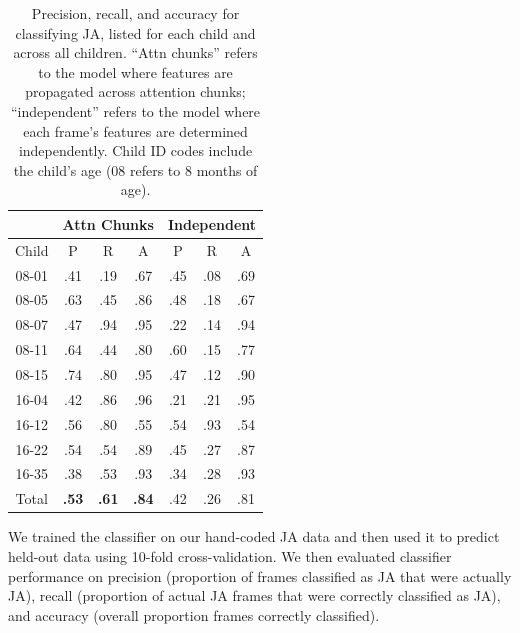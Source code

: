 \documentclass[10pt,letterpaper]{article}
\begin{document}
\begin{table}[t]
\centering
\begin{tabular}{c|ccc|ccc}
 &\multicolumn{3}{c}{Attn Chunks} & \multicolumn{3}{c}{Independent} \\
\hline
Child & P & R & A & P & R & A \\
\hline
08-01 & .41 & .19 & .67 & .45 & .08 & .69\\
08-05 & .63 & .45 & .86 & .48 & .18 & .67  \\
08-07 & .47 & .94 & .95 & .22 & .14 & .94  \\
08-11 & .64 & .44 & .80 & .60 & .15 & .77  \\
08-15 & .74 & .80 & .95 & .47 & .12 & .90 \\
16-04 & .42 & .86 & .96 & .21 & .21 & .95 \\
16-12 & .56 & .80 & .55 & .54 & .93 & .54 \\
16-22 & .54 & .54 & .89 & .45 & .27 & .87  \\
16-35 & .38 & .53 & .93 & .34 & .28 & .93\\
\hline
Total & {\bf .53} & {\bf .61} & {\bf .84 } & .42 &  .26 & .81\\

\hline
\end{tabular}
\caption{Precision, recall, and accuracy for classifying JA, listed for each child and across all children. ``Attn chunks'' refers to the model where features are propagated across attention chunks; ``independent'' refers to the model where each frame's features are determined independently. Child ID codes include the child's age (08 refers to 8 months of age).}
\label{tb:Results2}
\end{table}

We trained the classifier on our hand-coded JA data and then used it to predict held-out data using 10-fold cross-validation. We then evaluated classifier performance on precision (proportion of frames classified as JA that were actually JA), recall (proportion of actual JA frames that were correctly classified as JA), and accuracy (overall proportion frames correctly classified). 
\end{document}
